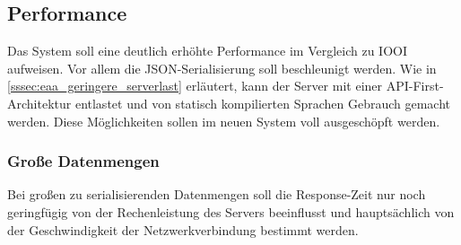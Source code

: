 \subsection{Performance}
\label{ssec:ea_performance}

Das System soll eine deutlich erhöhte Performance im Vergleich zu IOOI
aufweisen.  Vor allem die JSON-Serialisierung soll beschleunigt werden.  Wie in
\cref{sssec:eaa_geringere_serverlast} erläutert, kann der Server mit einer
API-First-Architektur entlastet und von statisch kompilierten Sprachen Gebrauch
gemacht werden.  Diese Möglichkeiten sollen im neuen System voll ausgeschöpft
werden.

\subsubsection{Große Datenmengen}
\label{sssec:eap_grosse_datenmengen}

Bei großen zu serialisierenden Datenmengen soll die Response-Zeit nur noch
geringfügig von der Rechenleistung des Servers beeinflusst und hauptsächlich
von der Geschwindigkeit der Netzwerkverbindung bestimmt werden.

